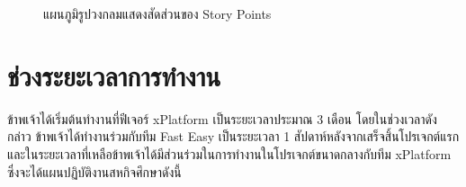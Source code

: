 \begin{figure} [H]
    \begin{center}
    \end{center}
    \caption[แผนภูมิรูปวงกลมแสดงสัดส่วนของ Story Points]{แผนภูมิรูปวงกลมแสดงสัดส่วนของ Story Points}
    \label{fig:story-point-pie-chart}
\end{figure}

\section{ช่วงระยะเวลาการทำงาน}ข้าพเจ้าได้เริ่มต้นทำงานที่ฟีเจอร์ xPlatform เป็นระยะเวลาประมาณ 3 เดือน โดยในช่วงเวลาดังกล่าว ข้าพเจ้าได้ทำงานร่วมกับทีม Fast Easy เป็นระยะเวลา 1 สัปดาห์หลังจากเสร็จสิ้นโปรเจกต์แรก และในระยะเวลาที่เหลือข้าพเจ้าได้มีส่วนร่วมในการทำงานในโปรเจกต์ขนาดกลางกับทีม xPlatform ซึ่งจะได้แผนปฏิบัติงานสหกิจศึกษาดังนี้

\newcommand{\gantttitlevertical}[1]{\gantttitle{\rotatebox{90}{#1}}{1}}
\newcommand{\gantttitles}[2]{%
  \foreach \x in {#1} {%
    \gantttitle{\x}{#2}%
  }%
}
\newcommand{\blackcell}{
    \ganttbar[bar/.append style={fill opacity=1, pattern=crosshatch, pattern color=black},progress=100,inline=false]{}{16}{16}}


